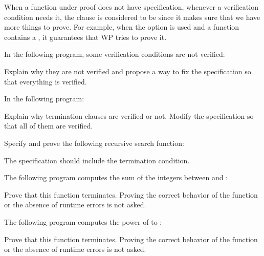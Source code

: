 

\begin{Information}
  When a function under proof does not have 
  specification, whenever a verification condition needs it, the clause is
  considered to be  since it makes sure that
  we have more things to prove. For example, when the option
   is used and a function contains a
  , it guarantees that WP tries to prove it.
\end{Information}






In the following program, some verification conditions are not verified:




Explain why they are not verified and propose a way to fix the specification so
that everything is verified.




In the following program:




Explain why termination clauses are verified or not. Modify the specification so
that all of them are verified.




Specify and prove the following recursive search function:




The specification should include the termination condition.




The following program computes the sum of the integers between 
and :




Prove that this function terminates. Proving the correct behavior of the
function or the absence of runtime errors is not asked.




The following program computes the power of  to :




Prove that this function terminates. Proving the correct behavior of the
function or the absence of runtime errors is not asked.
